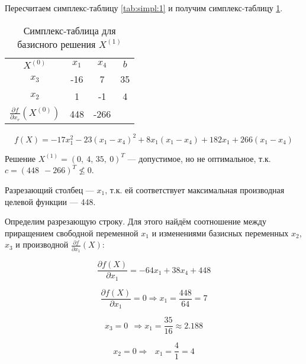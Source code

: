 Пересчитаем симплекс-таблицу \ref{tab:simpl:1} и получим симплекс-таблицу \ref{tab:simpl:2}.

\begin{table}[H]
\begin{center}
	\caption{Симплекс-таблица для базисного решения $X^{(1)}$}
	\label{tab:simpl:2}
	\def\tabcolsep{18pt}
	\def\arraystretch{1.5}
	\fontsize{13}{14}\selectfont
	\begin{tabular}{|c||c||c|c|}
		\hline 
		$X^{(0)}$ & $x_1$ & $x_4$ & $b$ \\ 
		\hhline{|=||=||=|=|} 
		$x_3$ & \cellcolor{pink} -16 & 7 & 35 \\ 
		\hhline{|=||=||=|=|}
		$x_2$ & 1 & -1 & 4 \\ 
		\hline
		$\frac{\partial f}{\partial x_r} \left(X^{(0)} \right)$ & 448 & -266 &  \\ 
		\hline 
	\end{tabular} 
\end{center}
\end{table}

\begin{equation*}
	f(X) = -17 x_1^2 - 23 (x_1 - x_4)^2 + 8 x_1 (x_1 - x_4) + 182 x_1 + 266 (x_1 - x_4)
\end{equation*}

Решение $X^{(1)} = (0,\ 4,\, 35,\ 0)^T$ --- допустимое, но не оптимальное, т.к. $c = (448\ \ -266)^T \nleq 0$.

Разрезающий столбец --- $x_1$, т.к. ей соответствует максимальная производная целевой функции --- 448.

Определим разрезающую строку. Для этого найдём соотношение между приращением свободной переменной $x_1$ и изменениями базисных переменных $x_2$, $x_3$ и производной $\frac{\partial f}{\partial x_1} \left(X \right)$:

\begin{equation*}
	\frac{\partial f(X)}{\partial x_1} = -64 x_1 + 38 x_4 + 448
\end{equation*}

\begin{equation*}
	\frac{\partial f(X)}{\partial x_1} = 0 \Rightarrow x_1 = \frac{448}{64} = 7
\end{equation*}

\begin{equation*}
	x_3 = 0\ \ \Rightarrow x_1 = \frac{35}{16} \approx 2.188
\end{equation*}

\begin{equation*}
	x_2 = 0 \Rightarrow \ \ \ x_1 = \frac{4}{1} = 4
\end{equation*}

